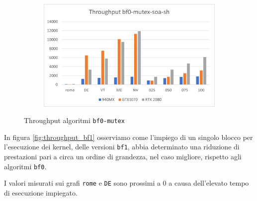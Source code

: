 \documentclass[12pt,a4paper,oneside]{book}
\begin{document}
\begin{figure}[b]
\begin{subfigure}{.5\textwidth}
		\end{subfigure}%
		\begin{subfigure}{.5\textwidth}
			\centering
			\includegraphics[width=\textwidth]{throughput_bf0-mutex-soa-sh}
		\end{subfigure}
		\caption{Throughput algoritmi \texttt{bf0-mutex}}
		\label{fig:throughput_bf0-mutex}
	\end{figure}

	In figura \ref{fig:throughput_bf1} osserviamo come l'impiego di un singolo blocco per l'esecuzione dei kernel, delle versioni \texttt{bf1}, abbia determinato una riduzione di prestazioni pari a circa un ordine di grandezza, nel caso migliore, rispetto agli algoritmi \texttt{bf0}.
	
	I valori misurati sui grafi \texttt{rome} e \texttt{DE} sono prossimi a $0$ a causa dell'elevato tempo di esecuzione impiegato.
\end{document}
